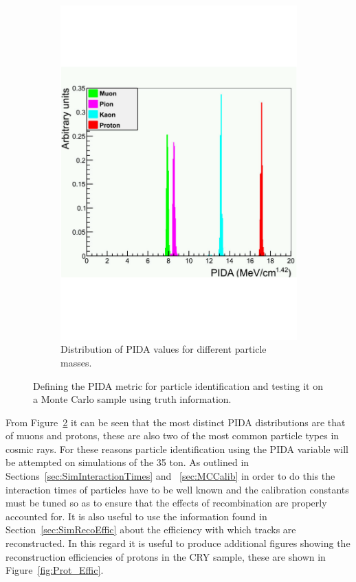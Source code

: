 \begin{figure}[h!]
\begin{subfigure}{0.45\textwidth}
    \includegraphics[width=\textwidth]{TruthPIDA}
    \caption{Distribution of PIDA values for different particle masses.}
    \label{fig:PIDA_MC}
  \end{subfigure}
  \caption[Defining the PIDA metric for particle identification.]
          {Defining the PIDA metric for particle identification and testing it on a Monte Carlo sample using truth information.}
  \label{fig:PIDAPlots}
\end{figure}

From Figure~\ref{fig:PIDAPlots} it can be seen that the most distinct PIDA distributions are that of muons and protons, these are also two of the most common particle types in cosmic rays. For these reasons particle identification using the PIDA variable will be attempted on simulations of the 35 ton. As outlined in Sections~\ref{sec:SimInteractionTimes} and ~\ref{sec:MCCalib} in order to do this the interaction times of particles have to be well known and the calibration constants must be tuned so as to ensure that the effects of recombination are properly accounted for. It is also useful to use the information found in Section~\ref{sec:SimRecoEffic} about the efficiency with which tracks are reconstructed. In this regard it is useful to produce additional figures showing the reconstruction efficiencies of protons in the CRY sample, these are shown in Figure~\ref{fig:Prot_Effic}.\\

